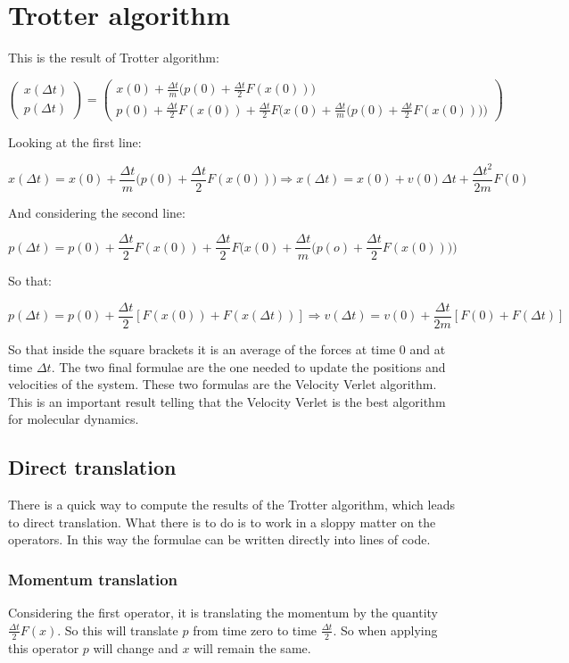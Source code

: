 \section{Trotter algorithm}
This is the result of Trotter algorithm:

$$\begin{pmatrix} x(\Delta t)\\ p(\Delta t)\end{pmatrix} = \begin{pmatrix} x(0) + \frac{\Delta t}{m}\biggl(p(0) + \frac{\Delta t}{2}F(x(0))\biggr) \\ p(0) + \frac{\Delta t}{2}F(x(0)) + \frac{\Delta t}{2}F\biggl(x(0) + \frac{\Delta t}{m}\biggl(p(0) + \frac{\Delta t}{2}F(x(0))\biggr)\biggr)\end{pmatrix}$$

Looking at the first line:

$$x(\Delta t) = x(0) + \frac{\Delta t}{m}\biggl(p(0) + \frac{\Delta t}{2}F(x(0))\biggr)\Rightarrow x(\Delta t) = x(0) + v(0)\Delta t + \frac{\Delta t^2}{2m}F(0)$$

And considering the second line:

$$p(\Delta t) = p(0) + \frac{\Delta t}{2}F(x(0)) + \frac{\Delta t}{2}F\biggl(x(0) + \frac{\Delta t}{m}\biggl(p(o) + \frac{\Delta t}{2}F(x(0))\biggr)\biggr)$$

So that:

$$p(\Delta t) = p(0) + \frac{\Delta t}{2}[F(x(0)) + F(x(\Delta t))]\Rightarrow v(\Delta t) = v(0) + \frac{\Delta t}{2m}[F(0) + F(\Delta t)]$$

So that inside the square brackets it is an average of the forces at time $0$ and at time $\Delta t$.
The two final formulae are the one needed to update the positions and velocities of the system.
These two formulas are the Velocity Verlet algorithm.
This is an important result telling that the Velocity Verlet is the best algorithm for molecular dynamics.

	\subsection{Direct translation}
	There is a quick way to compute the results of the Trotter algorithm, which leads to direct translation.
	What there is to do is to work in a sloppy matter on the operators.
	In this way the formulae can be written directly into lines of code.

		\subsubsection{Momentum translation}
		Considering the first operator, it is translating the momentum by the quantity $\frac{\Delta t}{2}F(x)$.
		So this will translate $p$ from time zero to time $\frac{\Delta t}{2}$.
		So when applying this operator $p$ will change and $x$ will remain the same.

